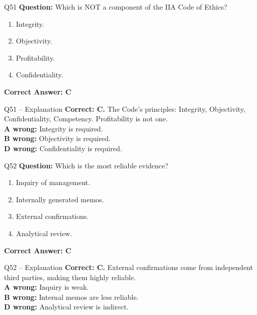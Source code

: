 \documentclass[aspectratio=169,10pt]{beamer}
\begin{document}
	\begin{frame}[t]{Q51}
		\small
		\textbf{Question:} Which is NOT a component of the IIA Code of Ethics?
		\begin{enumerate}[label=\Alph*.,itemsep=1pt,topsep=2pt]
			\item Integrity.
			\item Objectivity.
			\item Profitability.
			\item Confidentiality.
		\end{enumerate}
		\vspace{4pt}
		\textbf{Correct Answer: C}
	\end{frame}
	
	\begin{frame}[t]{Q51 -- Explanation}
		\small
		\textbf{Correct: C.} The Code's principles: Integrity, Objectivity, Confidentiality, Competency. Profitability is not one. \\[4pt]
		\textbf{A wrong:} Integrity is required. \\[2pt]
		\textbf{B wrong:} Objectivity is required. \\[2pt]
		\textbf{D wrong:} Confidentiality is required.
	\end{frame}
	
	\begin{frame}[t]{Q52}
		\small
		\textbf{Question:} Which is the most reliable evidence?
		\begin{enumerate}[label=\Alph*.,itemsep=1pt,topsep=2pt]
			\item Inquiry of management.
			\item Internally generated memos.
			\item External confirmations.
			\item Analytical review.
		\end{enumerate}
		\vspace{4pt}
		\textbf{Correct Answer: C}
	\end{frame}
	
	\begin{frame}[t]{Q52 -- Explanation}
		\small
		\textbf{Correct: C.} External confirmations come from independent third parties, making them highly reliable. \\[4pt]
		\textbf{A wrong:} Inquiry is weak. \\[2pt]
		\textbf{B wrong:} Internal memos are less reliable. \\[2pt]
		\textbf{D wrong:} Analytical review is indirect.
	\end{frame}
	
\end{document}
